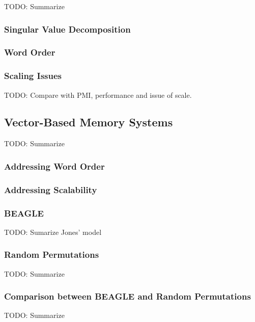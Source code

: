 \documentclass[man]{apa6}
\begin{document}
TODO: Summarize \cite{Landauer1997}

\subsubsection{Singular Value Decomposition}

\subsubsection{Word Order}

\subsubsection{Scaling Issues}

TODO: Compare with PMI, performance and issue of scale. \cite{Budiu2007}

\subsection{Vector-Based Memory Systems}

TODO: Summarize \cite{Plate1995}

\subsubsection{Addressing Word Order}

\subsubsection{Addressing Scalability}

\subsubsection{BEAGLE}

TODO: Sumarize Jones' model \cite{Jones2007}

\subsubsection{Random Permutations}

TODO: Summarize \cite{Sahlgren2008}

\subsubsection{Comparison between BEAGLE and Random Permutations}

TODO: Summarize \cite{Recchia2010}
\end{document}

